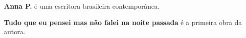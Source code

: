 \textbf{Anna P.} é uma escritora brasileira contemporânea.

\textbf{Tudo que eu pensei mas não falei na noite passada} é a primeira obra da autora. 
